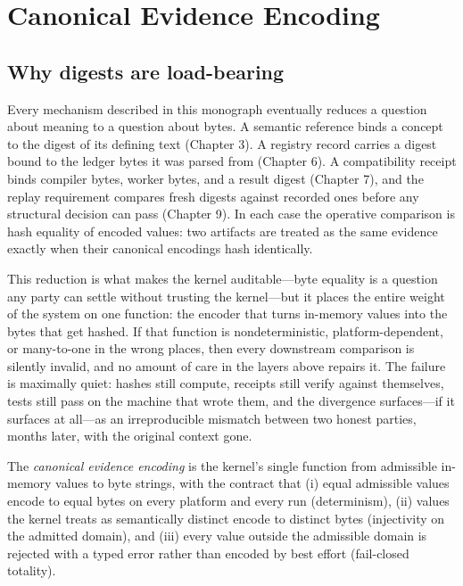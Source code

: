 \chapter{Canonical Evidence Encoding}\label{ch05:encoding}

\section{Why digests are load-bearing}\label{ch05:loadbearing}

Every mechanism described in this monograph eventually reduces a question
about meaning to a question about bytes. A semantic reference binds a concept
to the digest of its defining text (Chapter 3). A registry record carries a
digest bound to the ledger bytes it was parsed from (Chapter 6). A
compatibility receipt binds compiler bytes, worker bytes, and a result digest
(Chapter 7), and the replay requirement compares fresh digests against
recorded ones before any structural decision can pass (Chapter 9). In each
case the operative comparison is hash equality of encoded values: two
artifacts are treated as the same evidence exactly when their canonical
encodings hash identically.

This reduction is what makes the kernel auditable---byte equality is a
question any party can settle without trusting the kernel---but it places the
entire weight of the system on one function: the encoder that turns in-memory
values into the bytes that get hashed. If that function is nondeterministic,
platform-dependent, or many-to-one in the wrong places, then every downstream
comparison is silently invalid, and no amount of care in the layers above
repairs it. The failure is maximally quiet: hashes still compute, receipts
still verify against themselves, tests still pass on the machine that wrote
them, and the divergence surfaces---if it surfaces at all---as an
irreproducible mismatch between two honest parties, months later, with the
original context gone.

\begin{definition}\label{ch05:def:encoding}
The \emph{canonical evidence encoding} is the kernel's single function from
admissible in-memory values to byte strings, with the contract that (i) equal
admissible values encode to equal bytes on every platform and every run
(determinism), (ii) values the kernel treats as semantically distinct encode
to distinct bytes (injectivity on the admitted domain), and (iii) every value
outside the admissible domain is rejected with a typed error rather than
encoded by best effort (fail-closed totality).
\end{definition}

